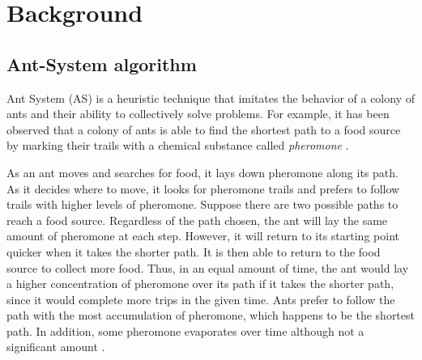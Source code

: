 \documentclass[11pt]{article}
\begin{document}
\section{Background}\label{background} 

\subsection{Ant-System algorithm}\label{max_clique} 

Ant System (AS) is a heuristic technique that imitates the behavior of a
colony of ants and their ability to collectively solve problems.  For
example, it has been observed that a colony of ants is able to find the
shortest path to a food source by marking their trails with a chemical
substance called {\it pheromone} \cite{BDT}\cite{DG}.

As an ant moves and searches for food, it lays down pheromone along its
path. As it decides where to move, it looks for pheromone trails and prefers
to follow trails with higher levels of pheromone. Suppose there are two
possible paths to reach a food source.  Regardless of the path chosen, the ant
will lay the same amount of pheromone at each step. However, it will return to
its starting point quicker when it takes the shorter path.  It is then able to
return to the food source to collect more food.  Thus, in an equal amount of
time, the ant would lay a higher concentration of pheromone over its path if
it takes the shorter path, since it would complete more trips in the given
time.  Ants prefer to follow the path with the most accumulation of pheromone,
which happens to be the shortest path. In addition, some pheromone evaporates
over time although not a significant amount \cite{BDT}\cite{DG}.
\end{document}
